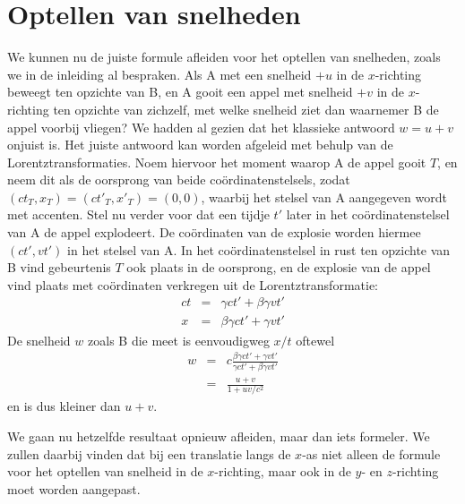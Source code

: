 \section{Optellen van snelheden}
We kunnen nu de juiste formule afleiden voor het optellen van
snelheden, zoals we in de inleiding al bespraken.  Als A met een
snelheid $+u$ in de $x$-richting beweegt ten opzichte van B, en A
gooit een appel met snelheid $+v$ in de $x$-richting ten opzichte van
zichzelf, met welke snelheid ziet dan waarnemer B de appel voorbij
vliegen?  We hadden al gezien dat het klassieke antwoord $w=u+v$
onjuist is. Het juiste antwoord kan worden afgeleid met behulp van de
Lorentztransformaties. Noem hiervoor het moment waarop A de appel gooit $T$, en neem dit als de
 oorsprong van beide co\"ordinatenstelsels, zodat $(ct_T,x_T)=(ct'_T,x'_T)=(0,0)$, waarbij
het stelsel van A aangegeven wordt met accenten. Stel nu verder voor dat een tijdje $t'$ later in het co\"ordinatenstelsel
van A de appel explodeert. De co\"ordinaten van de explosie worden hiermee $(ct',vt')$ in het stelsel van A.
In het co\"ordinatenstelsel in rust ten opzichte van B vind gebeurtenis $T$ ook plaats in de oorsprong, en de
explosie van de appel vind plaats met co\"ordinaten verkregen uit de Lorentztransformatie:
\begin{eqnarray}
ct & = & \gamma c t' + \beta \gamma vt' \\ \nonumber
x & = & \beta \gamma c t' + \gamma vt'
\end{eqnarray}
De snelheid $w$ zoals B die meet is eenvoudigweg $x/t$ oftewel
\begin{eqnarray}
w &=& c\frac{\beta\gamma c t'+\gamma v t'}{\gamma c t'+\beta \gamma vt'} \\\nonumber
 &=& \frac{u+v}{1+uv/c^2}
\end{eqnarray}
en is dus kleiner dan $u+v$.


We gaan nu hetzelfde resultaat opnieuw afleiden, maar dan iets
formeler. We zullen daarbij vinden dat bij een translatie langs de
$x$-as niet alleen de formule voor het optellen van snelheid in de
$x$-richting, maar ook in de $y$- en $z$-richting moet worden
aangepast.

